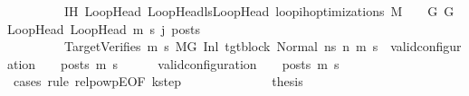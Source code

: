 \begin{isabellebody}
\ \ \ \ \ \ \ \ \ IH{\isacharcolon}{\kern0pt}\ {\isachardoublequoteopen}{\isasymforall}{\isacharparenleft}{\kern0pt}LoopHead{\isacharcomma}{\kern0pt}\ LoopHead{\isacharprime}{\kern0pt}{\isacharparenright}{\kern0pt}{\isasymin}lsLoopHead{\isachardot}{\kern0pt}\ loop{\isacharunderscore}{\kern0pt}ih{\isacharunderscore}{\kern0pt}optimizations\ M\ {\isasymLambda}\ {\isasymGamma}\ {\isasymOmega}\ G\ G{\isacharprime}{\kern0pt}\ LoopHead\ LoopHead{\isacharprime}{\kern0pt}\ m{\isacharprime}{\kern0pt}\ s{\isacharprime}{\kern0pt}\ j\ posts{\isachardoublequoteclose}\ \isanewline
\ \ \ \ \ \ \ \ \ TargetVerifies{\isacharcolon}{\kern0pt}\ {\isachardoublequoteopen}{\isacharparenleft}{\kern0pt}{\isasymforall}m{}{\isacharprime}{\kern0pt}\ s{}{\isacharprime}{\kern0pt}{\isachardot}{\kern0pt}\ {\isacharparenleft}{\kern0pt}M{\isacharcomma}{\kern0pt}{\isasymLambda}{\isacharcomma}{\kern0pt}{\isasymGamma}{\isacharcomma}{\kern0pt}{\isasymOmega}{\isacharcomma}{\kern0pt}G{\isacharprime}{\kern0pt}\ {\isasymturnstile}{\isacharparenleft}{\kern0pt}Inl\ tgt{\isacharunderscore}{\kern0pt}block{\isacharcomma}{\kern0pt}\ Normal\ ns{\isacharparenright}{\kern0pt}\ {\isacharminus}{\kern0pt}n{\isasymrightarrow}{\isacharasterisk}{\kern0pt}\ {\isacharparenleft}{\kern0pt}m{}{\isacharprime}{\kern0pt}{\isacharcomma}{\kern0pt}\ s{}{\isacharprime}{\kern0pt}{\isacharparenright}{\kern0pt}{\isacharparenright}{\kern0pt}\ {\isasymlongrightarrow}\ valid{\isacharunderscore}{\kern0pt}configuration\ {\isasymLambda}\ {\isasymGamma}\ {\isasymOmega}\ posts\ m{}{\isacharprime}{\kern0pt}\ s{}{\isacharprime}{\kern0pt}{\isacharparenright}{\kern0pt}{\isachardoublequoteclose}\isanewline
\ \ \isamarkupfalse%
\ \ \ {\isachardoublequoteopen}valid{\isacharunderscore}{\kern0pt}configuration\ {\isasymLambda}\ {\isasymGamma}\ {\isasymOmega}\ posts\ m{\isacharprime}{\kern0pt}\ s{\isacharprime}{\kern0pt}{\isachardoublequoteclose}\isanewline
\ \ \isamarkupfalse%
\ {\isacharparenleft}{\kern0pt}cases\ rule{\isacharcolon}{\kern0pt}\ relpowp{\isacharunderscore}{\kern0pt}E{}{\isacharunderscore}{\kern0pt}{}{\isacharbrackleft}{\kern0pt}OF\ k{\isacharunderscore}{\kern0pt}step{\isacharbrackright}{\kern0pt}{\isacharparenright}{\kern0pt}\isanewline
\ \ \ \ \isamarkupfalse%
\ {}\isanewline
\ \ \ \ \isamarkupfalse%
\ \isamarkupfalse%
\ {\isacharquery}{\kern0pt}thesis\ \isanewline
\ \ \ \ \ \ \isamarkupfalse%

\end{isabellebody}
